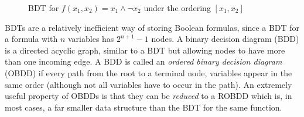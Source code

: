 \documentclass[11pt]{report}
\begin{document}
\begin{figure}
\centering
{}
	\caption{BDT for $f(x_1, x_2) = x_1 \land \lnot x_2$ under the ordering $[x_1, x_2]$}
\label{fig:BDT}
\end{figure}

BDTs are a relatively inefficient way of storing Boolean formulas, since a BDT for a formula with $n$ variables has $2^{n+1} - 1$ nodes. 
A binary decision diagram (BDD) is a directed acyclic graph, similar to a BDT but allowing nodes to have more than one incoming edge. A BDD is called an \textit{ordered binary decision diagram} (OBDD) if every path from the root to a terminal node, variables appear in the same order (although not all variables have to occur in the path). An extremely useful property of  OBDDs is that they can be \textit{reduced} to a ROBDD which is, in most cases, a far smaller data structure than the BDT for the same function. 
\end{document}
